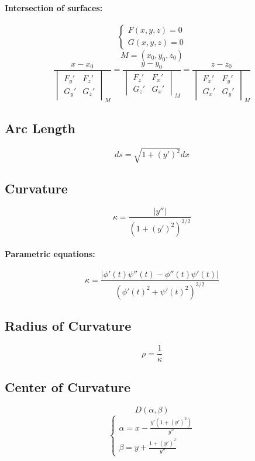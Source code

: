 \documentclass{article}
\begin{document}
\paragraph{Intersection of surfaces:}
\[
    \begin{cases}
        F(x, y, z) = 0 \\
        G(x, y, z) = 0
    \end{cases}
\]
\[
    M = (x_0, y_0, z_0)
\]
\[
    \frac{x - x_0}{\begin{vmatrix} F_y' & F_z' \\ G_y' & G_z' \end{vmatrix}_M} = \frac{y - y_0}{\begin{vmatrix} F_z' & F_x' \\ G_z' & G_x' \end{vmatrix}_M} = \frac{z - z_0}{\begin{vmatrix} F_x' & F_y' \\ G_x' & G_y' \end{vmatrix}_M}
\]

\subsection{Arc Length}
\[
    ds = \sqrt{1 + (y')^2} dx
\]

\subsection{Curvature}
\[
    \kappa = \frac{|y''|}{(1 + (y')^2)^{3/2}}
\]
\paragraph{Parametric equations:}
\[
    \kappa = \frac{|\phi'(t)\psi''(t) - \phi''(t)\psi'(t)|}{(\phi'(t)^2 + \psi'(t)^2)^{3/2}}
\]

\subsection{Radius of Curvature}
\[
    \rho = \frac{1}{\kappa}
\]

\subsection{Center of Curvature}
\[
    D(\alpha, \beta)
\]
\[
    \begin{cases}
        \alpha = x - \frac{y'(1 + (y')^2)}{y''} \\
        \beta = y + \frac{1 + (y')^2}{y''}
    \end{cases}
\]
\end{document}

